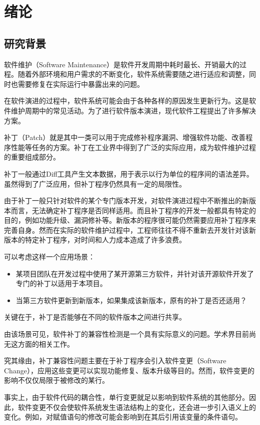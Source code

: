 \chapter{绪论}
\section{研究背景}

软件维护（Software Maintenance）是软件开发周期中耗时最长、开销最大的过程\cite{lehnert2011review}。随着外部环境和用户需求的不断变化，软件系统需要随之进行适应和调整，同时也需要修复在实际运行中暴露出来的问题。

在软件演进的过程中，软件系统可能会由于各种各样的原因发生更新行为。这是软件维护周期中的常见活动\cite{pigoski1996practical}。为了进行软件版本演进，现代软件工程提出了许多解决方案。

补丁（Patch）就是其中一类可以用于完成修补程序漏洞、增强软件功能、改善程序性能等任务的方案。补丁在工业界中得到了广泛的实际应用，成为软件维护过程的重要组成部分\cite{le2014patch}。

补丁一般通过Diff工具产生文本数据\cite{hunt1976algorithm}，用于表示以行为单位的程序间的语法差异。虽然得到了广泛应用，但补丁程序仍然具有一定的局限性。

由于补丁一般只针对软件的某个专门版本开发，对软件演进过程中不断推出的新版本而言，无法确定补丁程序是否同样适用。而且补丁程序的开发一般都具有特定的目的，例如功能升级、漏洞修补等。新版本的程序很可能仍然需要应用补丁程序来完善自身。然而在实际的软件维护过程中，工程师往往不得不重新去开发针对该新版本的特定补丁程序，对时间和人力成本造成了许多浪费。

可以考虑这样一个应用场景：

\begin{itemize}
	\item 某项目团队在开发过程中使用了某开源第三方软件，并针对该开源软件开发了专门的补丁以适用于本项目。
	\item 当第三方软件更新到新版本，如果集成该新版本，原有的补丁是否还适用？
\end{itemize}

关键在于，补丁是否能够在不同的软件版本之间进行共享。

由该场景可见，软件补丁的兼容性检测是一个具有实际意义的问题。学术界目前尚无这方面的相关工作。

究其缘由，补丁兼容性问题主要在于补丁程序会引入软件变更（Software Change）\cite{buckley2005towards}，应用这些变更可以实现功能修复、版本升级等目的。然而，软件变更的影响不仅仅局限于被修改的某行。

事实上，由于软件代码的耦合性，单行变更就足以影响到软件系统的其他部分\cite{wilkerson2012software,tao2012software}。因此，软件变更不仅会使软件系统发生语法结构上的变化，还会进一步引入语义上的变化。例如，对赋值语句的修改可能会影响到在其后引用该变量的条件语句。

